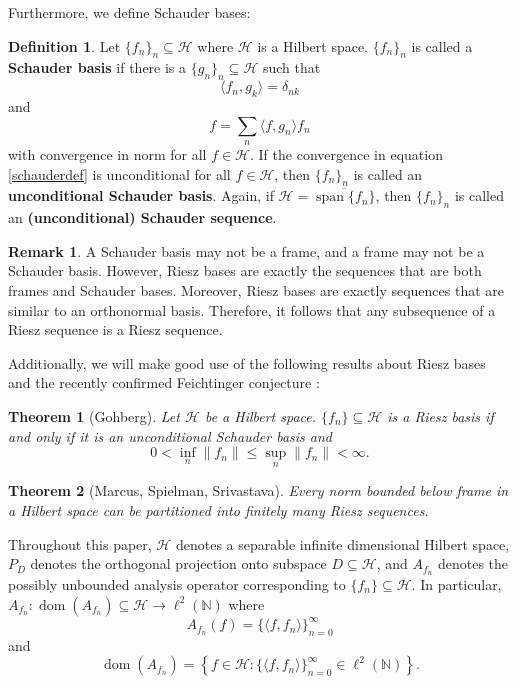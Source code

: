 \documentclass[11pt]{amsart}
\newtheorem*{thm*}{Theorem}
\theoremstyle{definition}
\newtheorem{def_n}[thm]{Definition}
\newtheorem{rem}[thm]{Remark}
\numberwithin{equation}{section}
\newcommand{\Hcal}{\mathcal{H}} %
\begin{document}
Furthermore, we define Schauder bases:
\begin{def_n}
Let $\{f_{n}\}_{n}\subseteq \Hcal$ where $\Hcal$ is a Hilbert space. $\{f_n\}_{n}$ is called a \textbf{Schauder basis} if there is a $\{g_{n}\}_{n}\subseteq \Hcal$ such that
$$\langle f_n,g_k\rangle=\delta_{nk}$$ and
\begin{equation}\label{schauderdef}
f=\sum_{n}\langle f,g_n\rangle f_n
\end{equation}
with convergence in norm for all $f\in \Hcal$.
If the convergence in equation \eqref{schauderdef} is unconditional for all $f\in \Hcal$, then $\{f_n\}_n$ is called an \textbf{unconditional Schauder basis}. Again, if $\Hcal=\overline{\operatorname{span}\{f_n\}}$, then $\{f_n\}_n$ is called an \textbf{(unconditional) Schauder sequence}.
\end{def_n}
\begin{rem}
A Schauder basis may not be a frame, and a frame may not be a Schauder basis. However, Riesz bases are exactly the sequences that are both frames and Schauder bases. Moreover, Riesz bases are exactly sequences that are similar to an orthonormal basis. Therefore, it follows that any subsequence of a Riesz sequence is a Riesz sequence.
\end{rem}

Additionally, we will make good use of the following results about Riesz bases \cite{Gohberg1969Theory} and the recently confirmed Feichtinger conjecture \cite{Marcus2015Interlacing}:
\begin{thm*}[Gohberg]
Let $\Hcal$ be a Hilbert space. $\{f_n\}\subseteq \Hcal$
is a Riesz basis if and only if it
is an unconditional Schauder basis and
$$0 < \inf_{n}
\|f_n\| \leq \sup_{n}
\|f_n\| < \infty.$$
\end{thm*}

\begin{thm*}[Marcus, Spielman, Srivastava]
Every norm bounded below frame in a Hilbert space can be partitioned into
finitely many Riesz sequences.
\end{thm*}

Throughout this paper, $\Hcal$ denotes a separable infinite dimensional Hilbert space, $P_{D}$ denotes the orthogonal projection onto subspace $D\subseteq \Hcal$, and $A_{f_n}$ denotes the possibly unbounded analysis operator corresponding to $\{f_n\}\subseteq \Hcal$. In particular,
$A_{f_n}: \operatorname{dom}(A_{f_n})\subseteq \Hcal\to \ell^{2}(\mathbb{N})$ where 
$$A_{f_n}(f)=\{\langle f, f_n\rangle\}_{n=0}^{\infty}$$ and
    $$\operatorname{dom}(A_{f_n})=\left\{f\in \Hcal:\{\langle f, f_n\rangle\}_{n=0}^{\infty}\in \ell^{2}(\mathbb{N}) \right\} .$$
\end{document}
